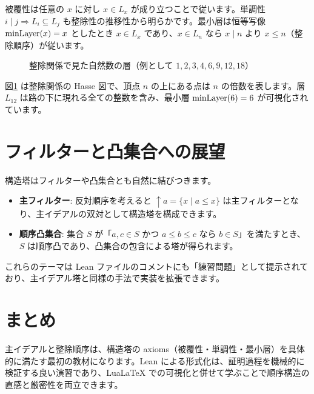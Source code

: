 \documentclass[a4paper,11pt]{ltjsarticle}
\theoremstyle{definition}
\begin{document}
被覆性は任意の $x$ に対し $x\in L_x$ が成り立つことで従います。単調性 $i\mid j \Rightarrow L_i \subseteq L_j$ も整除性の推移性から明らかです。最小層は恒等写像 $\operatorname{minLayer}(x)=x$ としたとき $x\in L_x$ であり、$x\in L_n$ なら $x\mid n$ より $x \leq n$（整除順序）が従います。

\begin{figure}[htbp]
  \centering
  \caption{整除関係で見た自然数の層（例として $1,2,3,4,6,9,12,18$）}
  \label{fig:divisibility}
\end{figure}

図\ref{fig:divisibility} は整除関係の Hasse 図で、頂点 $n$ の上にある点は $n$ の倍数を表します。層 $L_{12}$ は路の下に現れる全ての整数を含み、最小層 $\operatorname{minLayer}(6)=6$ が可視化されています。

\section{フィルターと凸集合への展望}

構造塔はフィルターや凸集合とも自然に結びつきます。

\begin{itemize}
  \item \textbf{主フィルター}: 反対順序を考えると $\uparrow a = \{x \mid a \leq x\}$ は主フィルターとなり、主イデアルの双対として構造塔を構成できます。
  \item \textbf{順序凸集合}: 集合 $S$ が「$a,c\in S$ かつ $a\leq b\leq c$ なら $b\in S$」を満たすとき、$S$ は順序凸であり、凸集合の包含による塔が得られます。
\end{itemize}

これらのテーマは Lean ファイルのコメントにも「練習問題」として提示されており、主イデアル塔と同様の手法で実装を拡張できます。

\section{まとめ}

主イデアルと整除順序は、構造塔の axioms（被覆性・単調性・最小層）を具体的に満たす最初の教材になります。Lean による形式化は、証明過程を機械的に検証する良い演習であり、Lua\LaTeX{} での可視化と併せて学ぶことで順序構造の直感と厳密性を両立できます。
\end{document}
